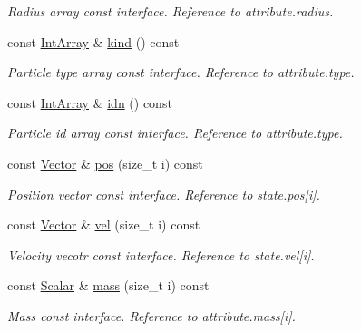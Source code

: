 \begin{DoxyCompactItemize}
\begin{DoxyCompactList}\small\item\em Radius array const interface. Reference to attribute.\+radius. \end{DoxyCompactList}\item 
const \mbox{\hyperlink{classparticles_a1b766bf5ccced2005beaacbb07e46bf9}{Int\+Array}} \& \mbox{\hyperlink{classparticles_a64f8ee4ddc337e0f05fd41088cf07f00}{kind}} () const
\begin{DoxyCompactList}\small\item\em Particle type array const interface. Reference to attribute.\+type. \end{DoxyCompactList}\item 
const \mbox{\hyperlink{classparticles_a1b766bf5ccced2005beaacbb07e46bf9}{Int\+Array}} \& \mbox{\hyperlink{classparticles_a5edbd588217cd1a7deb2010bf8f3e1fe}{idn}} () const
\begin{DoxyCompactList}\small\item\em Particle id array const interface. Reference to attribute.\+type. \end{DoxyCompactList}\item 
const \mbox{\hyperlink{classparticles_a1ef27d2f046db6514d79c8d7ee5c97d5}{Vector}} \& \mbox{\hyperlink{classparticles_a5a92ff9c5826ad7e4622f36665bc48a6}{pos}} (size\+\_\+t i) const
\begin{DoxyCompactList}\small\item\em Position vector const interface. Reference to state.\+pos\mbox{[}i\mbox{]}. \end{DoxyCompactList}\item 
const \mbox{\hyperlink{classparticles_a1ef27d2f046db6514d79c8d7ee5c97d5}{Vector}} \& \mbox{\hyperlink{classparticles_a20e4848e04fd15de36b6c3c442dd7840}{vel}} (size\+\_\+t i) const
\begin{DoxyCompactList}\small\item\em Velocity vecotr const interface. Reference to state.\+vel\mbox{[}i\mbox{]}. \end{DoxyCompactList}\item 
const \mbox{\hyperlink{classparticles_a57a6b6582045a4b20742b99c513e9f63}{Scalar}} \& \mbox{\hyperlink{classparticles_affba23a9d10479685f3c8ec995cb1a35}{mass}} (size\+\_\+t i) const
\begin{DoxyCompactList}\small\item\em Mass const interface. Reference to attribute.\+mass\mbox{[}i\mbox{]}. \end{DoxyCompactList}\item 

\end{DoxyCompactItemize}
